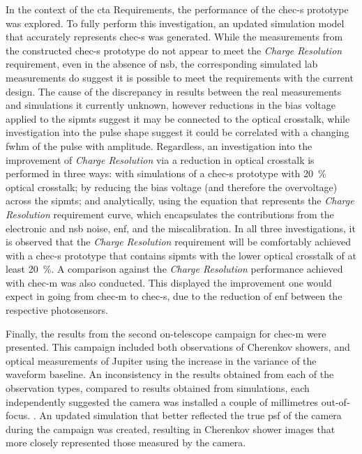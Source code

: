 In the context of the \gls{cta} Requirements, the performance of the \gls{chec-s} prototype was explored. To fully perform this investigation, an updated simulation model that accurately represents \gls{chec-s} was generated. While the measurements from the constructed \gls{chec-s} prototype do not appear to meet the \textit{Charge Resolution} requirement, even in the absence of \gls{nsb}, the corresponding simulated lab measurements do suggest it is possible to meet the requirements with the current design. The cause of the discrepancy in results between the real measurements and simulations it currently unknown, however reductions in the bias voltage applied to the \gls{sipmts} suggest it may be connected to the optical crosstalk, while investigation into the pulse shape suggest it could be correlated with a changing \gls{fwhm} of the pulse with amplitude. Regardless, an investigation into the improvement of \textit{Charge Resolution} via a reduction in optical crosstalk is performed in three ways: with simulations of a \gls{chec-s} prototype with \SI{20}{\percent} optical crosstalk; by reducing the bias voltage (and therefore the overvoltage) across the \glspl{sipmt}; and analytically, using the equation that represents the \textit{Charge Resolution} requirement curve, which encapsulates the contributions from the electronic and \gls{nsb} noise, \gls{enf}, and the miscalibration. In all three investigations, it is observed that the \textit{Charge Resolution} requirement will be comfortably achieved with a \gls{chec-s} prototype that contains \glspl{sipmt} with the lower optical crosstalk of at least \SI{20}{\percent}. A comparison against the \textit{Charge Resolution} performance achieved with \gls{chec-m} was also conducted. This displayed the improvement one would expect in going from \gls{chec-m} to \gls{chec-s}, due to the reduction of \gls{enf} between the respective photosensors.

Finally, the results from the second on-telescope campaign for \gls{chec-m} were presented. This campaign included both observations of Cherenkov showers, and optical measurements of Jupiter using the increase in the variance of the waveform baseline. An inconsistency in the results obtained from each of the observation types, compared to results obtained from simulations, each independently suggested the camera was installed a couple of millimetres out-of-focus. . An updated simulation that better reflected the true \gls{psf} of the camera during the campaign was created, resulting in Cherenkov shower images that more closely represented those measured by the camera. 
 
